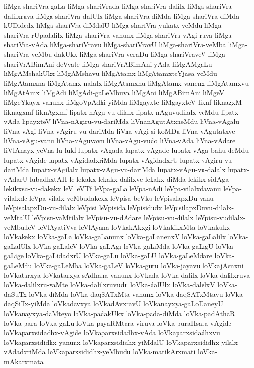 {liMga-shariVra-gaLa
liMga-shariVrada
liMga-shariVra-dalilx
liMga-shariVra-dalilxruva
liMga-shariVra-dalUlx
liMga-shariVra-diMda
liMga-shariVra-diMda-kUDidedx
liMga-shariVra-diMdalU
liMga-shariVra-yukatx-veMdu
liMga-shariVra-rUpadalilx
liMga-shariVra-vanunx
liMga-shariVra-vAgi-ruva
liMga-shariVra-vAda
liMga-shariVravu
liMga-shariVravU
liMga-shariVra-veMba
liMga-shariVra-veMbu-dakUkx
liMga-shariVra-veraDu
liMga-shariVraveV
liMga-shariVrABimAni-deVvate
liMga-shariVrABimAni-yAda
liMgAMgaLu
liMgAMshakUkx
liMgAMshavu
liMgAtamx
liMgAtamxteYjasa-veMdu
liMgAtamxna
liMgAtamx-nalalx
liMgAtamxnu
liMgAtamx-vanenx
liMgAtamxvu
liMgAtAmx
liMgAdi
liMgAdi-gaLeMbuva
liMgAni
liMgABimAni
liMgeV
liMgeYkayx-vanunx
liMgoVpAdhi-yiMda
liMgayxte
liMgayxteV
liknf
liknagxM
liknagxmf
liknAgxmf
lipatx-nAgu-vu-dilalx
lipatx-nAguvudilalx-veMdu
lipatx-vAda
lipayxteV
liVna-nAgiru-vu-dariMda
liVnanAgutAtxneMdu
liVna-vAgalu
liVna-vAgi
liVna-vAgiru-vu-dariMda
liVna-vAgi-si-koMDu
liVna-vAgutatxve
liVna-vAgu-vanu
liVna-vAguvavu
liVna-vAgu-vudo
liVna-vAda
liVna-vAdare
liVlAnayx-yeVna
lu
lukf
lupatx-vAgada
lupatx-vAgade
lupatx-vAga-bahu-deMdu
lupatx-vAgide
lupatx-vAgidadxriMda
lupatx-vAgidadxrU
lupatx-vAgiru-vu-dariMda
lupatx-vAgilalx
lupatx-vAgu-vu-dariMda
lupatx-vAgu-vu-dalalx
lupatx-vAdarU
lubadhxtAH
le
lekakx
lekakx-dalilxve
lekakx-diMda
lekikx-sidAga
lekikxsu-vu-dakekx
leV
leVTf
leVpa-gaLa
leVpa-nAdi
leVpa-vilalxdavanu
leVpa-vilalxde
leVpa-vilalx-veMbudakekx
leVpisa-beVku
leVpisalapxDu-vanu
leVpisalapxDu-vu-dilalx
leVpisi
leVpisida
leVpisidudx
leVpisilapxDuvu-dilalx-veMtalU
leVpisu-vaMtilalx
leVpisu-vu-dAdare
leVpisu-vu-dilalx
leVpisu-vudilalx-veMbudeV
leVlAyatiVva
leVlAyana
loVkakAkxgi
loVkakikxMta
loVkakukx
loVkakekx
loVka-gaLa
loVka-gaLanunx
loVka-gaLanenxV
loVka-gaLalilx
loVka-gaLalUlx
loVka-gaLaleV
loVka-gaLAgi
loVka-gaLiMda
loVka-gaLigU
loVka-gaLige
loVka-gaLidadxrU
loVka-gaLu
loVka-gaLU
loVka-gaLeMdare
loVka-gaLeMdu
loVka-gaLeMba
loVka-gaLeV
loVka-guru
loVka-jayavu
loVkajAcnxni
loVkatarxya
loVkatarxya-sAdhana-vanunx
loVkada
loVka-dalilx
loVka-dalilxruva
loVka-dalilxru-vaMte
loVka-dalilxruvudu
loVka-dalUlx
loVka-dalelxV
loVka-daSuTx
loVka-diMda
loVka-daqSATxMta-vanunx
loVka-daqSATxMtavu
loVka-daqSiTx-yiMda
loVkadavxya
loVkadAvxravU
loVkanayxya-gaLoDaneyU
loVkanayxya-daMteyo
loVka-padakUkx
loVka-pada-diMda
loVka-padAthaR
loVka-para-loVka-gaLu
loVka-payaRMtara-viruva
loVka-puraHsara-vAgide
loVkaparxsidadhx-vAgide
loVkaparxsidadhx-vAda
loVkaparxsidadhxvu
loVkaparxsididhx-yanunx
loVkaparxsididhx-yiMdalU
loVkaparxsididhx-yilalx-vAdadxriMda
loVkaparxsididhx-yeMbudu
loVka-matikArxmati
loVka-mAkarxmata
}
